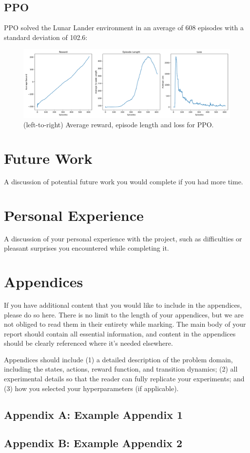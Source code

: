 \documentclass{article}
\begin{document}
\subsection{PPO}
PPO solved the Lunar Lander environment in an average of 608 episodes with a standard deviation of 102.6:
\begin{figure}[H]
  \centering
  \includegraphics[scale=0.35]{1.png}
  \caption{(left-to-right) Average reward, episode length and loss for PPO.}
\end{figure}
\section{Future Work}
A discussion of potential future work you would complete if you had more
time.

\section{Personal Experience}
A discussion of your personal experience with the project, such as
difficulties or pleasant surprises you encountered while completing it.




\newpage
\section*{Appendices}
If you have additional content that you would like to include in the appendices, please do so here.
There is no limit to the length of your appendices, but we are not obliged to read them in their entirety while marking. The main body of your report should contain all essential information, and content in the appendices should be clearly referenced where it's needed elsewhere.



Appendices should include (1) a detailed description of the problem domain,
including the states, actions, reward function, and transition dynamics; (2) all experimental
details so that the reader can fully replicate your experiments; and (3) how you selected your
hyperparameters (if applicable).
\subsection*{Appendix A: Example Appendix 1}
\subsection*{Appendix B: Example Appendix 2}
\end{document}
